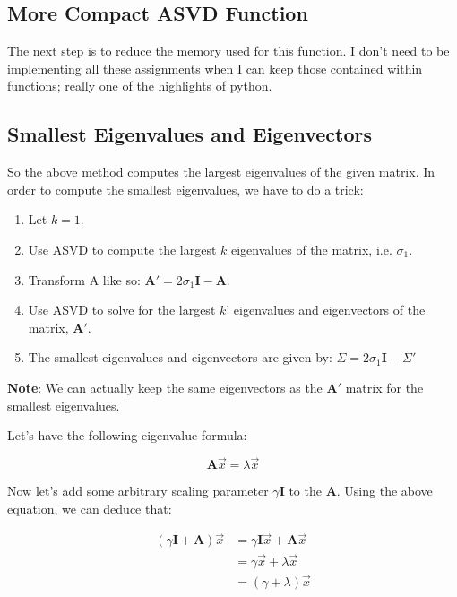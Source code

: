 \documentclass[11pt]{article}
\providecommand{\tightlist}{%
      \setlength{\itemsep}{0pt}\setlength{\parskip}{0pt}}
\begin{document}
    \hypertarget{more-compact-asvd-function}{%
\subsection{More Compact ASVD
Function}\label{more-compact-asvd-function}}

    The next step is to reduce the memory used for this function. I don't
need to be implementing all these assignments when I can keep those
contained within functions; really one of the highlights of python.

    \hypertarget{smallest-eigenvalues-and-eigenvectors}{%
\subsection{Smallest Eigenvalues and
Eigenvectors}\label{smallest-eigenvalues-and-eigenvectors}}

    So the above method computes the largest eigenvalues of the given
matrix. In order to compute the smallest eigenvalues, we have to do a
trick:

\begin{enumerate}
\def\labelenumi{\arabic{enumi}.}
\tightlist
\item
  Let \(k=1\).
\item
  Use ASVD to compute the largest \(k\) eigenvalues of the matrix, i.e.
  \(\sigma_1\).
\item
  Transform A like so:
  \(\mathbf{A}' = 2\sigma_1 \mathbf{I}-\mathbf{A}\).
\item
  Use ASVD to solve for the largest \(k\)' eigenvalues and eigenvectors
  of the matrix, \(\mathbf{A}'\).
\item
  The smallest eigenvalues and eigenvectors are given by:
  \(\Sigma=2\sigma_1 \mathbf{I}-\Sigma'\)
\end{enumerate}

\textbf{Note}: We can actually keep the same eigenvectors as the
\(\mathbf{A}'\) matrix for the smallest eigenvalues.

Let's have the following eigenvalue formula:

\begin{equation}
\mathbf{A}\vec{x}=\lambda\vec{x}
\end{equation}

Now let's add some arbitrary scaling parameter \(\gamma \mathbf{I}\) to
the \(\mathbf{A}\). Using the above equation, we can deduce that:

\begin{align}
\left(\gamma \mathbf{I+A}\right)\vec{x} &= \gamma \mathbf{I} \vec{x} + \mathbf{A}\vec{x} \\
    &= \gamma \vec{x} + \lambda \vec{x}\\
    &= \left( \gamma + \lambda \right) \vec{x}
\end{align}
\end{document}
